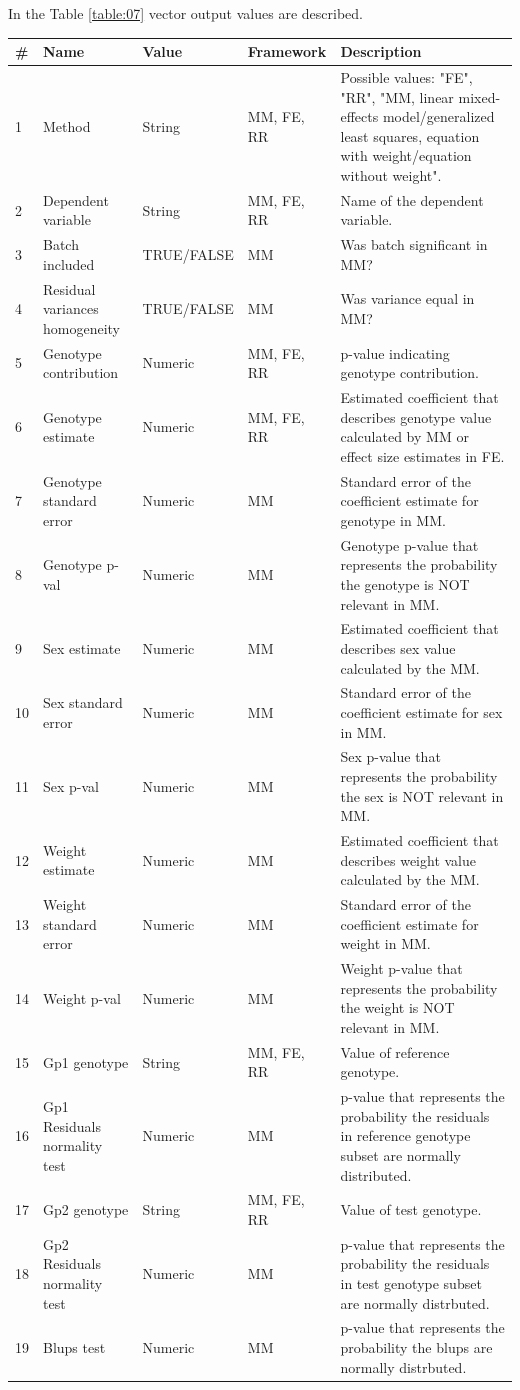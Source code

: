 \documentclass[12pt,a4paper]{article}
\begin{document}
In the Table \ref{table:07} vector output values are described.
\begin{table}
 
\begin{tabular}{| l | l | l | l | p{10cm} |}
  \hline
\#&Name&Value&Framework&Description\\\hline
1&Method&String&MM, FE, RR&Possible values: "FE", "RR",  "MM, linear mixed-effects model/generalized least squares, equation with weight/equation without weight".\\
2&Dependent variable&String&MM, FE, RR&Name of the dependent variable.\\
3&Batch included&TRUE/FALSE&MM&Was batch significant in MM?\\
4&Residual variances homogeneity&TRUE/FALSE&MM&Was variance equal in MM?\\
5&Genotype contribution&Numeric&MM, FE, RR&p-value indicating genotype contribution.\\
6&Genotype estimate&Numeric&MM, FE, RR&Estimated coefficient that describes genotype value calculated by MM or effect size estimates in FE.\\
7&Genotype standard error&Numeric&MM&Standard error of the coefficient estimate for genotype in MM.\\
8&Genotype p-val&Numeric&MM&Genotype p-value that represents the probability the genotype is NOT relevant in MM.\\
9&Sex estimate&Numeric&MM&Estimated coefficient that describes sex value calculated by the MM.\\
10&Sex standard error&Numeric&MM&Standard error of the coefficient estimate for sex in MM.\\
11&Sex p-val&Numeric&MM&Sex p-value that represents the probability the sex is NOT relevant in MM.\\
12&Weight estimate&Numeric&MM&Estimated coefficient that describes weight value calculated by the MM.\\
13&Weight standard error&Numeric&MM&Standard error of the coefficient estimate for weight in MM.\\
14&Weight p-val&Numeric&MM&Weight p-value that represents the probability the weight is NOT relevant in MM.\\
15&Gp1 genotype&String&MM, FE, RR&Value of reference genotype.\\
16&Gp1 Residuals normality test&Numeric&MM&p-value that represents the probability the residuals in reference genotype subset are normally distributed.\\
17&Gp2 genotype&String&MM, FE, RR&Value of test genotype.\\
18&Gp2 Residuals normality test&Numeric&MM&p-value that represents the probability the residuals in test genotype subset are normally distrbuted.\\
19&Blups test&Numeric&MM&p-value that represents the probability the blups are normally distrbuted.\\
\hline  
\end{tabular}
\end{table}
\end{document}

